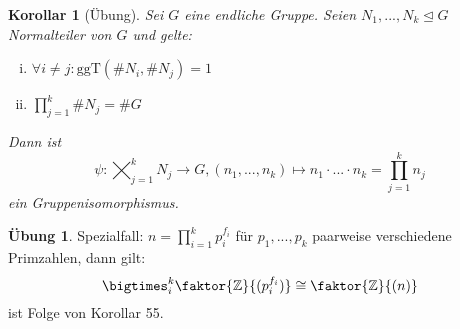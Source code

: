 \documentclass[a4paper]{article}
\theoremstyle{plain}
\newtheorem{kor}[thm]{Korollar}
\theoremstyle{definition}
\newtheorem*{ubng*}{Übung}
\begin{document}
\begin{kor}[Übung]
  Sei $G$ eine endliche Gruppe. Seien $N_{1}, ..., N_{k} \trianglelefteq G$ Normalteiler von $G$ und gelte:
  \begin{enumerate}[(i)]
    \item $\forall i \ne j : \mathrm{ggT}(\#N_{i}, \#N_{j}) = 1$
    \item $\prod_{j=1}^k \# N_{j} = \#G$
  \end{enumerate}
  Dann ist $$\psi : \bigtimes_{j=1}^{k}N_{j} \longrightarrow G, (n_{1}, ..., n_{k}) \longmapsto n_{1}\cdot ... \cdot n_{k} = \prod_{j=1}^{k}n_{j}$$
  ein Gruppenisomorphismus.
\item
\end{kor}
\begin{ubng*}
Spezialfall: $n = \prod_{i=1}^{k}p_{i}^{f_{i}}$ für $p_{1}, ..., p_{k}$ paarweise verschiedene Primzahlen, dann gilt:
$$\bigtimes_{i}^{k}\faktor{\Bbb Z}{(p_{i}^{f_{i}})} \cong \faktor{\Bbb Z}{(n)}$$
ist Folge von Korollar 55.
\end{ubng*}
\end{document}
